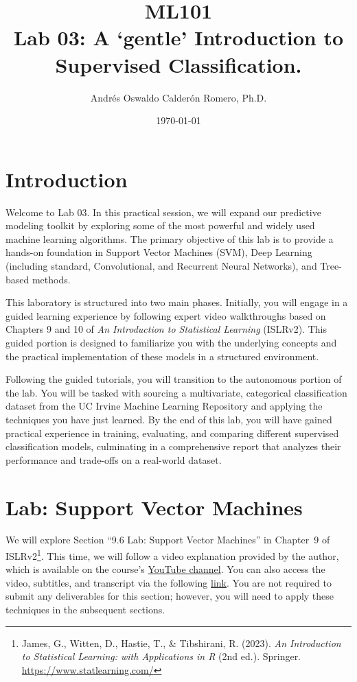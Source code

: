 \documentclass{article}
\title{ML101 \\ Lab 03: A `gentle' Introduction to Supervised Classification.}
\author{Andrés Oswaldo Calderón Romero, Ph.D.}
\date{\today}
\begin{document}
\maketitle

\section{Introduction}
\label{sec:intro}

Welcome to Lab 03. In this practical session, we will expand our predictive modeling toolkit by exploring some of the most powerful and widely used machine learning algorithms. The primary objective of this lab is to provide a hands-on foundation in Support Vector Machines (SVM), Deep Learning (including standard, Convolutional, and Recurrent Neural Networks), and Tree-based methods.

This laboratory is structured into two main phases. Initially, you will engage in a guided learning experience by following expert video walkthroughs based on Chapters 9 and 10 of \textit{An Introduction to Statistical Learning} (ISLRv2). This guided portion is designed to familiarize you with the underlying concepts and the practical implementation of these models in a structured environment.

Following the guided tutorials, you will transition to the autonomous portion of the lab. You will be tasked with sourcing a multivariate, categorical classification dataset from the UC Irvine Machine Learning Repository and applying the techniques you have just learned. By the end of this lab, you will have gained practical experience in training, evaluating, and comparing different supervised classification models, culminating in a comprehensive report that analyzes their performance and trade-offs on a real-world dataset.

\section{Lab: Support Vector Machines}
\label{sec:lab1}

We will explore Section ``9.6 Lab: Support Vector Machines'' in Chapter~9 of ISLRv2\footnote{James, G., Witten, D., Hastie, T., \& Tibshirani, R. (2023). \textit{An Introduction to Statistical Learning: with Applications in R} (2nd ed.). Springer. \url{https://www.statlearning.com/}}. This time, we will follow a video explanation provided by the author, which is available on the course's \href{https://youtu.be/WCRwbrNWrpw?si=C0IG8lw0GodNo86o}{YouTube channel}. You can also access the video, subtitles, and transcript via the following \href{https://drive.google.com/drive/folders/1Pkx3m8-cWBMfvwm-xwTh9dnTMLt9ukHj?usp=sharing}{link}. You are not required to submit any deliverables for this section; however, you will need to apply these techniques in the subsequent sections.
\end{document}
